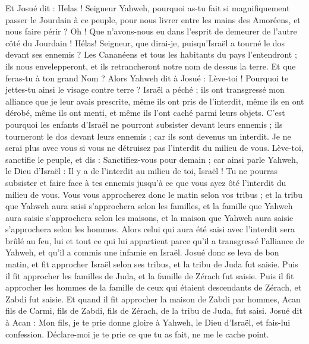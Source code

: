 \begin{multicols}{2}
Et Josué dit : Helas ! Seigneur Yahweh, pourquoi as-tu fait si magnifiquement passer le Jourdain à ce peuple, pour nous livrer entre les mains des Amoréens, et nous faire périr ? Oh ! Que n'avons-nous eu dans l'esprit de demeurer de l'autre côté du Jourdain !
Hélas! Seigneur, que dirai-je, puisqu'Israël a tourné le dos devant ses ennemis ?
Les Cananéens et tous les habitants du pays l'entendront ; ils nous envelepperont, et ils retrancheront notre nom de dessus la terre. Et que feras-tu à ton grand Nom ?
Alors Yahweh dit à Josué : Lève-toi ! Pourquoi te jettes-tu ainsi le visage contre terre ?
Israël a péché ; ils ont transgressé mon alliance que je leur avais prescrite, même ils ont pris de l'interdit, même ils en ont dérobé, même ils ont menti, et même ils l'ont caché parmi leurs objets.
C'est pourquoi les enfants d'Israël ne pourront subsister devant leurs ennemis ; ils tourneront le dos devant leurs ennemis ; car ils sont devenus un interdit. Je ne serai plus avec vous si vous ne détruisez pas l'interdit du milieu de vous.
Lève-toi, sanctifie le peuple, et dis : Sanctifiez-vous pour demain ; car ainsi parle Yahweh, le Dieu d'Israël : Il y a de l'interdit au milieu de toi, Israël ! Tu ne pourras subsister et faire face à tes ennemis jusqu'à ce que vous ayez ôté l'interdit du milieu de vous.
Vous vous approcherez donc le matin selon vos tribus ; et la tribu que Yahweh aura saisi s'approchera selon les familles, et la famille que Yahweh aura saisie s'approchera selon les maisons, et la maison que Yahweh aura saisie s'approchera selon les hommes.
Alors celui qui aura été saisi avec l'interdit sera brûlé au feu, lui et tout ce qui lui appartient parce qu'il a transgressé l'alliance de Yahweh, et qu'il a commis une infamie en Israël.
Josué donc se leva de bon matin, et fit approcher Israël selon ses tribus, et la tribu de Juda fut saisie.
Puis il fit approcher les familles de Juda, et la famille de Zérach fut saisie. Puis il fit approcher les hommes de la famille de ceux qui étaient descendants de Zérach, et Zabdi fut saisie.
Et quand il fit approcher la maison de Zabdi par hommes, Acan fils de Carmi, fils de Zabdi, fils de Zérach, de la tribu de Juda, fut saisi.
Josué dit à Acan : Mon fils, je te prie donne gloire à Yahweh, le Dieu d'Israël, et fais-lui confession. Déclare-moi je te prie ce que tu as fait, ne me le cache point.

\end{multicols}
